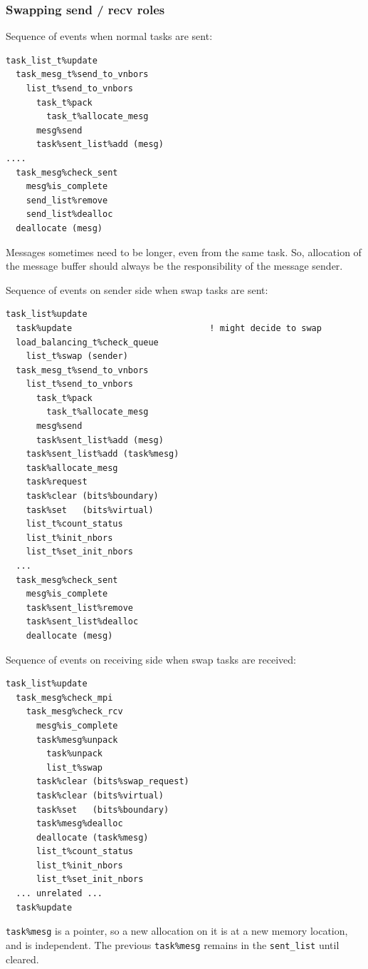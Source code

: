 \documentclass[paper=a4,fontsize=11pt]{scrartcl}
\numberwithin{equation}{section}		%
\numberwithin{figure}{section}			%
\numberwithin{table}{section}				%
\newcommand{\codecolor}{\color{Blue}}
\newcommand{\Code}[1]{{\codecolor\texttt{#1}}}
\begin{document}
\subsubsection{Swapping send / recv roles}
Sequence of events when normal tasks are sent:
{\codecolor
\begin{verbatim}
task_list_t%update
  task_mesg_t%send_to_vnbors
    list_t%send_to_vnbors
      task_t%pack
        task_t%allocate_mesg
      mesg%send
      task%sent_list%add (mesg)
....
  task_mesg%check_sent
    mesg%is_complete
    send_list%remove
    send_list%dealloc
  deallocate (mesg)
\end{verbatim}
}
Messages sometimes need to be longer, even from the same task.  So, allocation of the message buffer should always be the responsibility of the message sender.

Sequence of events on sender side when swap tasks are sent:
{\codecolor
\begin{verbatim}
task_list%update
  task%update                           ! might decide to swap
  load_balancing_t%check_queue
    list_t%swap (sender)
  task_mesg_t%send_to_vnbors
    list_t%send_to_vnbors
      task_t%pack
        task_t%allocate_mesg
      mesg%send
      task%sent_list%add (mesg)
    task%sent_list%add (task%mesg)
    task%allocate_mesg
    task%request
    task%clear (bits%boundary)
    task%set   (bits%virtual)
    list_t%count_status
    list_t%init_nbors
    list_t%set_init_nbors
  ...
  task_mesg%check_sent
    mesg%is_complete
    task%sent_list%remove
    task%sent_list%dealloc
    deallocate (mesg)
\end{verbatim}}

Sequence of events on receiving side when swap tasks are received:
{\codecolor
\begin{verbatim}
task_list%update
  task_mesg%check_mpi
    task_mesg%check_rcv
      mesg%is_complete
      task%mesg%unpack
        task%unpack
        list_t%swap
      task%clear (bits%swap_request)
      task%clear (bits%virtual)
      task%set   (bits%boundary)
      task%mesg%dealloc
      deallocate (task%mesg)
      list_t%count_status
      list_t%init_nbors
      list_t%set_init_nbors
  ... unrelated ...
  task%update
\end{verbatim}}

\Code{task\%mesg} is a pointer, so a new allocation on it is at a new memory location, and is independent.  The previous \Code{task\%mesg} remains in the \Code{sent\_list} until cleared.
\end{document}
